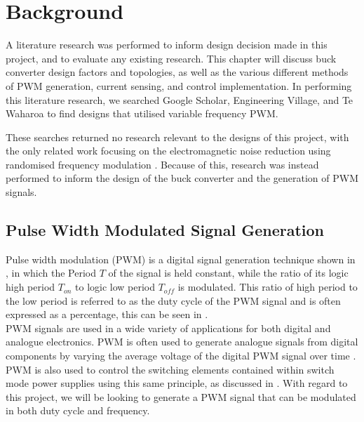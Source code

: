 \chapter{Background}\label{C:background}

A literature research was performed to inform design decision made in this project, and to evaluate any existing research. This chapter will discuss buck converter design factors and topologies, as well as the various different methods of PWM generation, current sensing, and control implementation. In performing this literature research, we searched Google Scholar, Engineering Village, and Te Waharoa to find designs that utilised variable frequency PWM. 

These searches returned no research relevant to the designs of this project, with the only related work focusing on the electromagnetic noise reduction using randomised frequency modulation \cite{Roman2001,Familiant2016}. Because of this, research was instead performed to inform the design of the buck converter and the generation of PWM signals.

\section{Pulse Width Modulated Signal Generation}\label{S:PWM_back}

Pulse width modulation (PWM) is a digital signal generation technique shown in , in which the Period $T$ of the signal is held constant, while the ratio of its logic high period $T_{on}$ to logic low period $T_{off}$ is modulated. This ratio of high period to the low period is referred to as the duty cycle of the PWM signal and is often expressed as a percentage, this can be seen in .\\

PWM signals are used in a wide variety of applications for both digital and analogue electronics. PWM is often used to generate analogue signals from digital components by varying the average voltage of the digital PWM signal over time \cite{Thoren}. PWM is also used to control the switching elements contained within switch mode power supplies using this same principle, as discussed in . With regard to this project, we will be looking to generate a PWM signal that can be modulated in both duty cycle and frequency.

